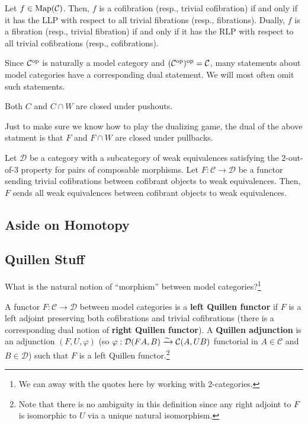 \documentclass[11pt]{article}
\renewcommand{\C}{\mathcal{C}}
\newcommand{\D}{\mathcal{D}}
\renewcommand{\phi}{\varphi}
\begin{document}
\begin{lemma}
Let $f\in\Map(\C)$. Then, $f$ is a cofibration (resp., trivial cofibration) if and only if it has the LLP with respect to all trivial fibrations (resp., fibrations). Dually, $f$ is a fibration (resp., trivial fibration) if and only if it has the RLP with respect to all trivial cofibrations (resp., cofibrations).
\end{lemma} 

Since $\C^{\op}$ is naturally a model category and $(\C^{\op})^{\op}=\C$, many statements about model categories have a corresponding dual statement. We will most often omit such statements.

\begin{corollary}
Both $C$ and $C\cap W$ are closed under pushouts.
\end{corollary}

Just to make sure we know how to play the dualizing game, the dual of the above statment is that $F$ and $F\cap W$ are closed under pullbacks.

\begin{lemma}[Brown]
Let $\D$ be a category with a subcategory of weak equivalences satisfying the $2$-out-of-$3$ property for pairs of composable morphisms. Let $F: \C\to\D$ be a functor sending trivial cofibrations between cofibrant objects to weak equivalences. Then, $F$ sends all weak equivalences between cofibrant objects to weak equivalences.
\end{lemma}

\subsection{Aside on Homotopy}


\subsection{Quillen Stuff}
What is the natural notion of ``morphism'' between model categories?\footnote{We can away with the quotes here by working with $2$-categories.}

\begin{definition}
A functor $F: \C\to\D$ between model categories is a \textbf{left Quillen functor} if $F$ is a left adjoint preserving both cofibrations and trivial cofibrations (there is a corresponding dual notion of \textbf{right Quillen functor}). A \textbf{Quillen adjunction} is an adjunction $(F,U,\phi)$ (so $\phi: \D(FA,B)\xto{\sim}\C(A,UB)$ functorial in $A\in\C$ and $B\in\D$) such that $F$ is a left Quillen functor.\footnote{Note that there is no ambiguity in this definition since any right adjoint to $F$ is isomorphic to $U$ via a unique natural isomorphism.}
\end{definition}
\end{document}
